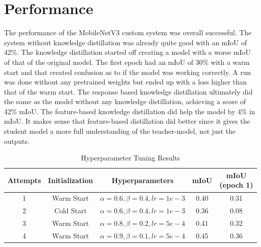 \documentclass[letterpaper,11pt]{article}
\begin{document}
\section{Performance}
The performance of the MobileNetV3 custom system was overall successful. The system without knowledge distillation was already quite good with an mIoU of 42\%. The knowledge distillation started off creating a model with a worse mIoU of that of the original model. The first epoch had an mIoU of 30\% with a warm start and that created confusion as to if the model was working correctly. A run was done without any pretrained weights but ended up with a loss higher than that of the warm start. The response based knowledge distillation ultimately did the same as the model without any knowledge distillation, achieving a score of 42\% mIoU. The feature-based knowledge distillation did help the model by 4\% in mIoU. It makes sense that feature-based distillation did better since it gives the student model a more full understanding of the teacher-model, not just the outputs.

\begin{table}[h]
  \centering
  \caption{Hyperparameter Tuning Results}
  \begin{tabular}{|c|c|c|c|c|}
    \hline
    \textbf{Attempts} & \textbf{Initialization} & \textbf{Hyperparameters}       & \textbf{mIoU} & \textbf{mIoU (epoch 1)} \\
    \hline
    1                 & Warm Start              & $\alpha=0.6,\beta=0.4,lr=1e-3$ & 0.40          & 0.31                    \\
    \hline
    2                 & Cold Start              & $\alpha=0.6,\beta=0.4,lr=1e-3$ & 0.36          & 0.08                    \\
    \hline
    3                 & Warm Start              & $\alpha=0.8,\beta=0.2,lr=5e-4$ & 0.41          & 0.32                    \\
    \hline
    4                 & Warm Start              & $\alpha=0.9,\beta=0.1,lr=5e-4$ & 0.45          & 0.36                    \\
    \hline
  \end{tabular}
\end{table}
\end{document}
